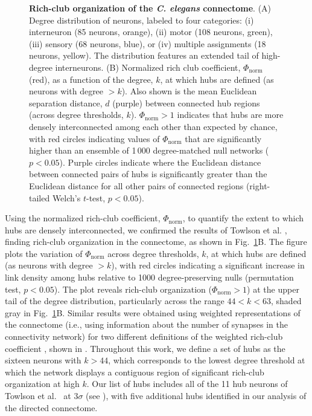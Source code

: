 \documentclass[10pt,letterpaper]{article}
\begin{document}
\begin{figure}[h]
   \centering
 \caption{\textbf{Rich-club organization of the \emph{C. elegans} connectome}.
(A) Degree distribution of neurons, labeled to four categories:
(i) interneuron (85 neurons, orange),
(ii) motor (108 neurons, green),
(iii) sensory (68 neurons, blue), or
(iv) multiple assignments (18 neurons, yellow).
The distribution features an extended tail of high-degree interneurons.
(B)
Normalized rich club coefficient, $\Phi_\mathrm{norm}$ (red), as a function of the degree, $k$, at which hubs are defined (as neurons with degree $>k$).
Also shown is the mean Euclidean separation distance, $d$ (purple) between connected hub regions (across degree thresholds, $k$).
$\Phi_\mathrm{norm} > 1$ indicates that hubs are more densely interconnected among each other than expected by chance, with red circles indicating values of $\Phi_\mathrm{norm}$ that are significantly higher than an ensemble of 1\,000 degree-matched null networks ($p < 0.05$).
Purple circles indicate where the Euclidean distance between connected pairs of hubs is significantly greater than the Euclidean distance for all other pairs of connected regions (right-tailed Welch's $t$-test, $p < 0.05$).
}
 \label{fig:Fig5}
 \end{figure}
 
Using the normalized rich-club coefficient, $\Phi_\mathrm{norm}$, to quantify the extent to which hubs are densely interconnected, we confirmed the results of Towlson et al. \cite{Towlson2013}, finding rich-club organization in the connectome, as shown in Fig.~\ref{fig:Fig5}B.
The figure plots the variation of $\Phi_\mathrm{norm}$ across degree thresholds, $k$, at which hubs are defined (as neurons with degree $>k$), with red circles indicating a significant increase in link density among hubs relative to 1000 degree-preserving nulls (permutation test, $p < 0.05$).
The plot reveals rich-club organization ($\Phi_\mathrm{norm} > 1$) at the upper tail of the degree distribution, particularly across the range $44 < k < 63$, shaded gray in Fig.~\ref{fig:Fig5}B.
Similar results were obtained using weighted representations of the connectome (i.e., using information about the number of synapses in the connectivity network) for two different definitions of the weighted rich-club coefficient \cite{Opsahl2008}, shown in .
Throughout this work, we define a set of hubs as the sixteen neurons with $k > 44$, which corresponds to the lowest degree threshold at which the network displays a contiguous region of significant rich-club organization at high $k$.
Our list of hubs includes all of the 11 hub neurons of Towlson et al.~\cite{Towlson2013} at $3 \sigma$ (see ), with five additional hubs identified in our analysis of the directed connectome.
\end{document}
